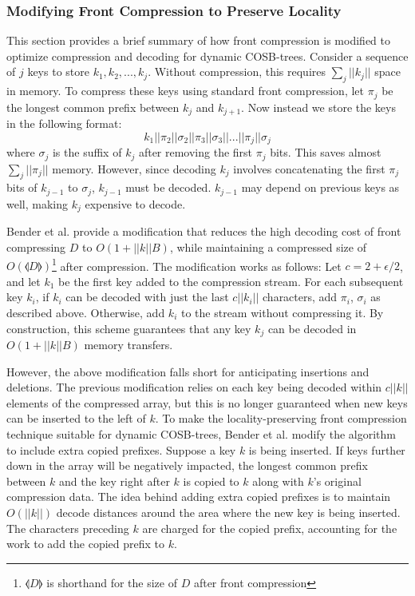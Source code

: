 \documentclass[preprint]{style}
\begin{document}
\subsubsection{Modifying Front Compression to Preserve Locality}

This section provides a brief summary of how front compression is modified to
optimize compression and decoding for dynamic COSB-trees. Consider a sequence
of $j$ keys to store $k_{1},k_{2},...,k_{j}$. Without compression, this
requires $\sum_{j}||k_{j}||$ space in memory. To compress these keys using
standard front compression, let $\pi_{j}$ be the longest common prefix between
$k_{j}$ and $k_{j+1}$. Now instead we store the keys in the following format:
\begin{equation}
  k_{1}||\pi_{2}||\sigma_{2}||\pi_{3}||\sigma_{3}||...||\pi_{j}||\sigma_{j}
\end{equation} 
where $\sigma_{j}$ is the suffix of $k_{j}$ after removing the first $\pi_{j}$
bits. This saves almost $\sum_{j}||\pi_{j}||$ memory. However, since decoding
$k_{j}$ involves concatenating the first $\pi_{j}$ bits of $k_{j-1}$ to
$\sigma_{j}$, $k_{j-1}$ must be decoded. $k_{j-1}$ may depend on previous keys
as well, making $k_{j}$ expensive to decode.

Bender et al. provide a modification that reduces the high decoding cost of
front compressing $D$ to $O(1+||k||B)$, while maintaining a compressed size of
$O(\llangle{D}\rrangle{})$\footnote{$\llangle{D}\rrangle{}$ is shorthand for
the size of $D$ after front compression} after compression. The modification
works as follows: Let $c = 2 + \epsilon/2$, and let $k_{1}$ be the first key
added to the compression stream. For each subsequent key $k_{i}$, if $k_{i}$
can be decoded with just the last $c||k_{i}||$ characters, add
$\pi_{i}$, $\sigma_{i}$ as described above. Otherwise, add $k_{i}$ to the stream
without compressing it. By construction, this scheme guarantees that any key
$k_{j}$ can be decoded in $O(1+||k||B)$ memory transfers.

However, the above modification falls short for anticipating insertions and
deletions. The previous modification relies on each key being decoded within
$c||k||$ elements of the compressed array, but this is no longer
guaranteed when new keys can be inserted to the left of $k$. To make the
locality-preserving front compression technique suitable for dynamic
COSB-trees, Bender et al. modify the algorithm to include extra copied
prefixes. Suppose a key $k$ is being inserted. If keys further down in the array will be negatively impacted, the longest common prefix between $k$ and the key right after $k$ is copied to $k$ along with $k$'s original compression data. The idea behind adding extra copied prefixes is to maintain $O(||k||)$ decode distances around the area where the new key is being inserted. The characters preceding $k$ are charged for the copied prefix, accounting for the work to add the copied prefix to $k$.
\end{document}
